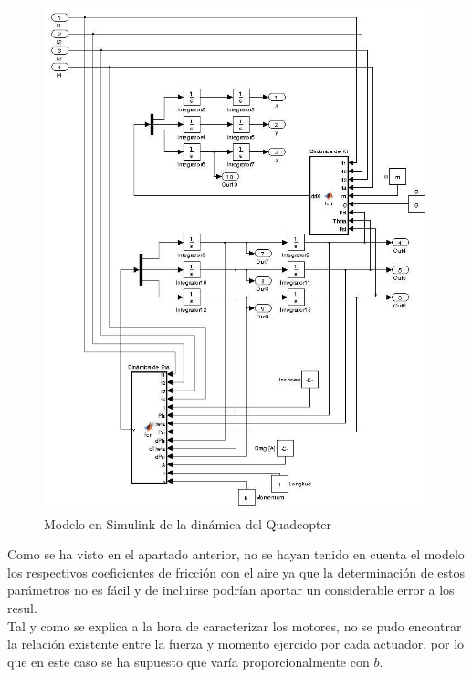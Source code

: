 \documentclass[twoside,11pt]{book}
\begin{document}
\begin{figure}[h!]
\begin{center}
\hspace{0cm} \includegraphics[scale=0.6,bb=0 0 620 750]{images/Simulink_model.png}
\caption{Modelo en Simulink de la dinámica del Quadcopter}
\end{center}
\end{figure}

Como se ha visto en el apartado anterior, no se hayan tenido en cuenta  el modelo los respectivos coeficientes de fricción con el aire ya que la determinación de estos parámetros no es fácil y de incluirse podrían aportar un considerable error a los resul. \\

Tal y como se explica a la hora de caracterizar los motores, no se pudo encontrar la relación existente entre la fuerza y momento ejercido por cada actuador, por lo que en este caso se ha supuesto que varía proporcionalmente con $b$.
\end{document}
